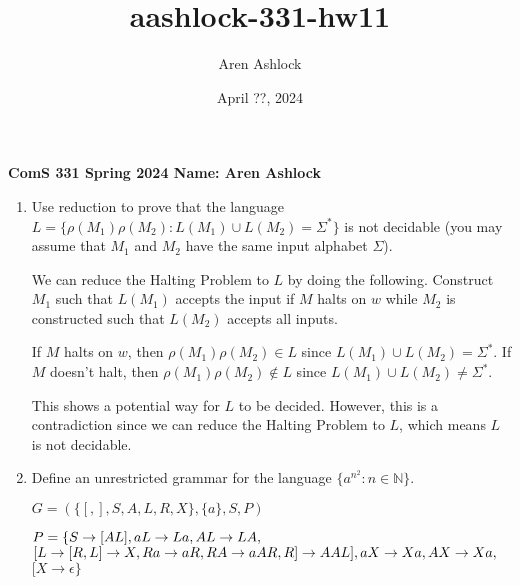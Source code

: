 \documentclass[12pt]{article}
\title{aashlock-331-hw11}
\author{Aren Ashlock}
\date{April ??, 2024}
\begin{document}
\noindent\textbf{ComS 331 \quad Spring 2024 \quad Name: Aren Ashlock}

\begin{enumerate}


\item Use reduction to prove that the language $L = \{\rho(M_1)\rho(M_2) : L(M_1) \cup L(M_2) = \Sigma^*\}$ is not decidable (you may assume that $M_1$ and $M_2$ have the same input alphabet $\Sigma$).

\color{blue}
    We can reduce the Halting Problem to $L$ by doing the following. Construct $M_1$ such that $L(M_1)$ accepts the input if $M$ halts on $w$ while $M_2$ is constructed such that $L(M_2)$ accepts all inputs.

    If $M$ halts on $w$, then $\rho(M_1)\rho(M_2) \in L$ since $L(M_1) \cup L(M_2) = \Sigma^*$. If $M$ doesn't halt, then $\rho(M_1)\rho(M_2) \notin L$ since $L(M_1) \cup L(M_2) \neq \Sigma^*$.

    This shows a potential way for $L$ to be decided. However, this is a contradiction since we can reduce the Halting Problem to $L$, which means $L$ is not decidable.
\color{black}



\item Define an unrestricted grammar for the language $\{a^{n^2} : n \in \mathbb{N}\}$.

\color{blue}
    $G = (\{[, ], S, A, L, R, X\}, \{a\}, S, P)$

    $P = \{
    S \rightarrow [AL],\\
    aL \rightarrow La,\\
    AL \rightarrow LA,\\
    $$[L \rightarrow [R,\\
    L] \rightarrow X,\\
    Ra \rightarrow aR,\\
    RA \rightarrow aAR,\\
    R] \rightarrow AAL],\\
    aX \rightarrow Xa,\\
    AX \rightarrow Xa,\\
    $$[X \rightarrow \epsilon
    \}$
\color{black}


\end{enumerate}
\end{document}
